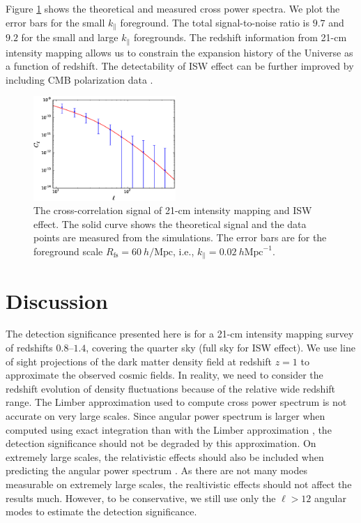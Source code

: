 \documentclass[prd,superscriptaddress,floatfix,notitlepage,nofootinbib,reprint]{revtex4-1}
\newcommand{\mr}{\mathrm}
\newcommand{\kpa}{k_\parallel}
\begin{document}
Figure \ref{fig:xcc3} shows the theoretical and measured cross power spectra.
We plot the error bars for the small $\kpa$ foreground.
The total signal-to-noise ratio is $9.7$ and $9.2$ for the small and large 
$\kpa$ foregrounds.
The redshift information from 21-cm intensity mapping allows us to constrain
the expansion history of the Universe as a function of redshift.
The detectability of ISW effect can be further improved by including CMB 
polarization data \cite{2011improveISW}.

\begin{figure}[tbp]
\begin{center}
\includegraphics[width=0.48\textwidth]{./figs/f6.eps}
\end{center}
\vspace{-0.7cm}
\caption{The cross-correlation signal of 21-cm intensity mapping and ISW effect.
    The solid curve shows the theoretical signal and the data points are 
    measured from the simulations. The error bars are for the foreground scale 
    $R_\mr{fs}=60\ h/\mr{Mpc}$, i.e., $\kpa=0.02\ h\mr{Mpc}^{-1}$.
}
\label{fig:xcc3}
\end{figure}

\section{Discussion}
\label{sec:dis}

The detection significance presented here is for a 21-cm intensity mapping
survey of redshifts $0.8$--$1.4$, covering the quarter sky (full sky for 
ISW effect).
We use line of sight projections of the dark matter density field at 
redshift $z=1$ to approximate the observed cosmic fields. 
In reality, we need to consider the redshift evolution of density fluctuations
because of the relative wide redshift range.
The Limber approximation used to compute cross power spectrum is not accurate 
on very large scales.
Since angular power spectrum is larger when computed using exact integration 
than with the Limber approximation \cite{2017Limber,2017Limber2}, the detection
significance should not be degraded by this approximation.
On extremely large scales, the relativistic effects should also be included 
when predicting the angular power spectrum \cite{2013GRSignal,2017GRSignal}.
As there are not many modes measurable on extremely large scales, the 
realtivistic effects should not affect the results much.
However, to be conservative, we still use only the $\ell>12$ angular modes to 
estimate the detection significance.
\end{document}
